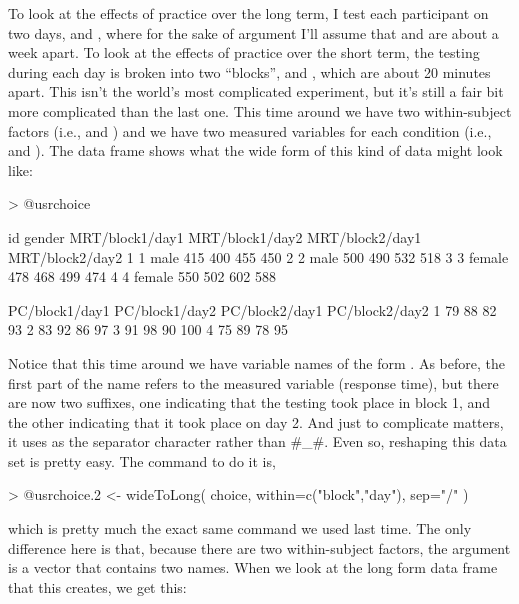 To look at the effects of practice over the long term, I test each participant on two days,  and , where for the sake of argument I'll assume that  and  are about a week apart. To look at the effects of practice over the short term, the testing during each day is broken into two ``blocks'',  and , which are about 20 minutes apart. This isn't the world's most complicated experiment, but it's still a fair bit more complicated than the last one. This time around we have two within-subject factors (i.e.,  and ) and we have two measured variables for each condition (i.e.,  and ). The  data frame shows what the wide form of this kind of data might look like: 
\begin{rblock1}
> @usr{choice}

  id gender MRT/block1/day1 MRT/block1/day2 MRT/block2/day1 MRT/block2/day2
1  1   male             415             400             455             450
2  2   male             500             490             532             518
3  3 female             478             468             499             474
4  4 female             550             502             602             588

  PC/block1/day1 PC/block1/day2 PC/block2/day1 PC/block2/day2
1             79             88             82             93
2             83             92             86             97
3             91             98             90            100
4             75             89             78             95
\end{rblock1}
Notice that this time around we have variable names of the form . As before, the first part of the name refers to the measured variable (response time), but there are now two suffixes, one indicating that the testing took place in block 1, and the other indicating that it took place on day 2. And just to complicate matters, it uses \rtext{/} as the separator character rather than \rtextverb#_#. Even so, reshaping this data set is pretty easy. The command to do it is,
\begin{rblock1}
> @usr{choice.2 <- wideToLong( choice, within=c("block","day"), sep="/" )}
\end{rblock1}
which is pretty much the exact same command we used last time. The only difference here is that, because there are two within-subject factors, the  argument is a vector that contains two names. When we look at the long form data frame that this creates, we get this:
